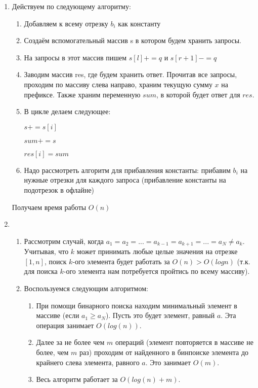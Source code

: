 \documentclass{article}
\begin{document}
\begin{enumerate}
\item Действуем по следующему алгоритму:

\begin{enumerate}
    \item Добавляем к всему отрезку $b_i$ как константу
    
    \item Создаём вспомогательный массив s в котором будем хранить запросы.
    
    \item На запросы в этот массив пишем $s[l] += q$ и $s[r+1] -= q$
    
    \item Заводим массив res, где будем хранить ответ. Прочитав все запросы, проходим по массиву слева направо, храним текущую сумму $x$ на префиксе. Также храним переменную $sum$, в которой будет ответ для $res$.
    
    \item В цикле делаем следующее:
    
    $s+= s[i]$
    
    $sum += s$
    
    $res[i] = sum$
    
    \item Надо рассмотреть алгоритм для прибавления константы: прибавим $b_i$ на нужные отрезки для каждого запроса (прибавление константы на подотрезок в офлайне)
    
\end{enumerate}

Получаем время работы $O(n)$

\item 

\begin{enumerate}
    \item Рассмотрим случай, когда $a_1 = a_2 = ... = a_{k-1} = a_{k+1} = ... = a_N \neq a_k$. Учитывая, что $k$ может принимать любые целые значения на отрезке $[1, n]$, поиск $k$-ого элемента будет работать за $O(n) > O(log n)$ (т.к. для поиска $k$-ого элемента нам потребуется пройтись по всему массиву).
    
    \item Воспользуемся следующим алгоритмом:
    
    \begin{enumerate}
        \item При помощи бинарного поиска находим минимальный элемент в массиве (если $a_1 \geq a_N$). Пусть это будет элемент, равный $a$. Эта операция занимает $O(log (n))$.
        
        \item Далее за не более чем $m$ операций (элемент повторяется в массиве не более, чем $m$ раз) проходим от найденного в бинпоиске элемента до крайнего слева элемента, равного $a$. Это занимает $O(m)$.
        
        \item Весь алгоритм работает за $O(log(n) + m)$.
    \end{enumerate}
\end{enumerate}

\end{enumerate}
\end{document}
